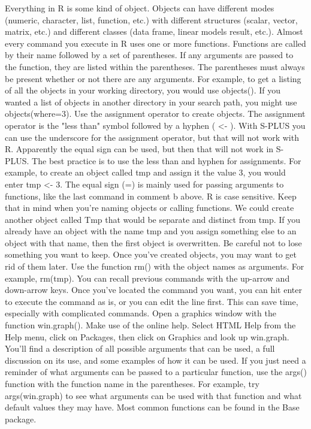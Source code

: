 Everything in R is some kind of object. Objects can have different modes (numeric, character, list, function, etc.) with different structures (scalar, vector, matrix, etc.) and different classes (data frame, linear models result, etc.). 
Almost every command you execute in R uses one or more functions. Functions are called by their name followed by a set of parentheses. If any arguments are passed to the function, they are listed within the parentheses. The parentheses must always be present whether or not there are any arguments. For example, to get a listing of all the objects in your working directory, you would use objects(). If you wanted a list of objects in another directory in your search path, you might use objects(where=3). 
Use the assignment operator to create objects. The assignment operator is the "less than" symbol followed by a hyphen ( <- ). With S-PLUS you can use the underscore for the assignment operator, but that will not work with R. Apparently the equal sign can be used, but then that will not work in S-PLUS. The best practice is to use the less than and hyphen for assignments. For example, to create an object called tmp and assign it the value 3, you would enter tmp <- 3. The equal sign (=) is mainly used for passing arguments to functions, like the last command in comment b above. 
R is case sensitive. Keep that in mind when you're naming objects or calling functions. We could create another object called Tmp that would be separate and distinct from tmp. 
If you already have an object with the name tmp and you assign something else to an object with that name, then the first object is overwritten. Be careful not to lose something you want to keep. 
Once you've created objects, you may want to get rid of them later. Use the function rm() with the object names as arguments. For example, rm(tmp). 
You can recall previous commands with the up-arrow and down-arrow keys. Once you've located the command you want, you can hit enter to execute the command as is, or you can edit the line first. This can save time, especially with complicated commands. 
Open a graphics window with the function win.graph(). 
Make use of the online help. Select HTML Help from the Help menu, click on Packages, then click on Graphics and look up win.graph. You'll find a description of all possible arguments that can be used, a full discussion on its use, and some examples of how it can be used. If you just need a reminder of what arguments can be passed to a particular function, use the args() function with the function name in the parentheses. For example, try args(win.graph) to see what arguments can be used with that function and what default values they may have. Most common functions can be found in the Base package. 
